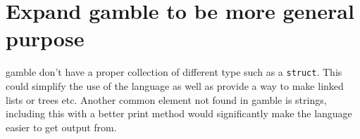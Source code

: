 \section{Expand \gls{gamble} to be more general purpose}
\gls{gamble} don't have a proper collection of different type such as a \texttt{struct}. 
This could simplify the use of the language as well as provide a way to make linked lists or trees etc.
Another common element not found in \gls{gamble} is strings, including this with a better print method would significantly make the language easier to get output from. 
